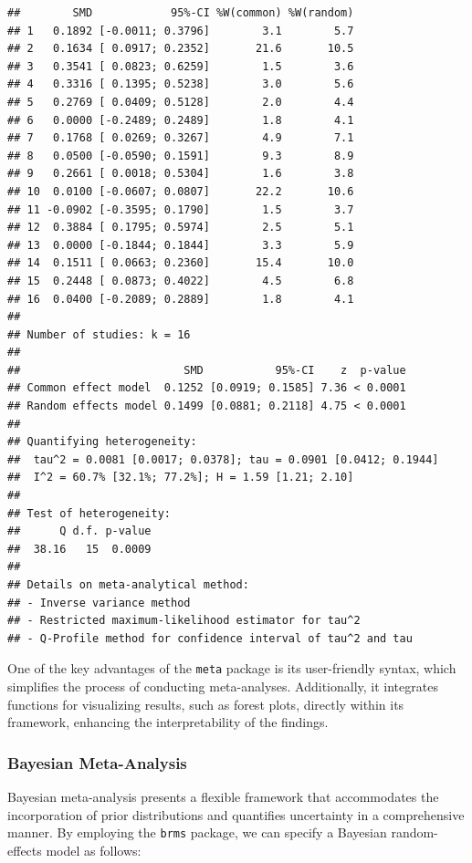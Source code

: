 \documentclass[
]{book}
\begin{document}
\begin{verbatim}
##        SMD            95%-CI %W(common) %W(random)
## 1   0.1892 [-0.0011; 0.3796]        3.1        5.7
## 2   0.1634 [ 0.0917; 0.2352]       21.6       10.5
## 3   0.3541 [ 0.0823; 0.6259]        1.5        3.6
## 4   0.3316 [ 0.1395; 0.5238]        3.0        5.6
## 5   0.2769 [ 0.0409; 0.5128]        2.0        4.4
## 6   0.0000 [-0.2489; 0.2489]        1.8        4.1
## 7   0.1768 [ 0.0269; 0.3267]        4.9        7.1
## 8   0.0500 [-0.0590; 0.1591]        9.3        8.9
## 9   0.2661 [ 0.0018; 0.5304]        1.6        3.8
## 10  0.0100 [-0.0607; 0.0807]       22.2       10.6
## 11 -0.0902 [-0.3595; 0.1790]        1.5        3.7
## 12  0.3884 [ 0.1795; 0.5974]        2.5        5.1
## 13  0.0000 [-0.1844; 0.1844]        3.3        5.9
## 14  0.1511 [ 0.0663; 0.2360]       15.4       10.0
## 15  0.2448 [ 0.0873; 0.4022]        4.5        6.8
## 16  0.0400 [-0.2089; 0.2889]        1.8        4.1
## 
## Number of studies: k = 16
## 
##                         SMD           95%-CI    z  p-value
## Common effect model  0.1252 [0.0919; 0.1585] 7.36 < 0.0001
## Random effects model 0.1499 [0.0881; 0.2118] 4.75 < 0.0001
## 
## Quantifying heterogeneity:
##  tau^2 = 0.0081 [0.0017; 0.0378]; tau = 0.0901 [0.0412; 0.1944]
##  I^2 = 60.7% [32.1%; 77.2%]; H = 1.59 [1.21; 2.10]
## 
## Test of heterogeneity:
##      Q d.f. p-value
##  38.16   15  0.0009
## 
## Details on meta-analytical method:
## - Inverse variance method
## - Restricted maximum-likelihood estimator for tau^2
## - Q-Profile method for confidence interval of tau^2 and tau
\end{verbatim}

One of the key advantages of the \texttt{meta} package is its user-friendly syntax, which simplifies the process of conducting meta-analyses. Additionally, it integrates functions for visualizing results, such as forest plots, directly within its framework, enhancing the interpretability of the findings.

\subsubsection{Bayesian Meta-Analysis}\label{bayesian-meta-analysis}

Bayesian meta-analysis presents a flexible framework that accommodates the incorporation of prior distributions and quantifies uncertainty in a comprehensive manner. By employing the \texttt{brms} package, we can specify a Bayesian random-effects model as follows:
\end{document}
